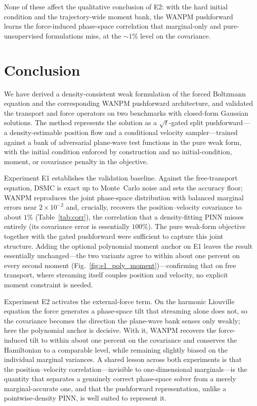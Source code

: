 \documentclass[11pt]{article}
\theoremstyle{plain}
\begin{document}
None of these affect the qualitative conclusion of E2: with the hard initial condition and the trajectory-wide moment bank, the WANPM pushforward learns the force-induced phase-space correlation that marginal-only and pure-unsupervised
formulations miss, at the $\sim\!1\%$ level on the covariance.


\section{Conclusion}
\label{sec:conclusion}

We have derived a density-consistent weak formulation of the forced Boltzmann equation and the corresponding WANPM pushforward architecture, and validated the transport and force operators on two benchmarks with closed-form Gaussian solutions. The method represents the solution as a $\sqrt t$-gated split pushforward---a density-estimable position flow and a conditional velocity sampler---trained against a bank of adversarial plane-wave test functions in the pure weak form, with the initial condition enforced by construction and no initial-condition, moment, or covariance penalty in the objective.

Experiment E1 establishes the validation baseline. Against the free-transport equation, DSMC is exact up to Monte~Carlo noise and sets the accuracy floor; WANPM reproduces the joint phase-space distribution with balanced marginal errors near $2\times10^{-2}$ and, crucially, recovers the position--velocity covariance to about $1\%$ (Table~\ref{tab:corr}), the correlation that a density-fitting PINN misses entirely (its covariance error is essentially $100\%$). The pure weak-form objective together with the gated pushforward were sufficient to capture this joint structure. Adding the optional polynomial moment anchor on E1 leaves the result essentially unchanged---the two variants agree to within about one percent on every second moment (Fig.~\ref{fig:e1_poly_moment})---confirming that on free transport, where streaming itself couples position and velocity, no explicit moment constraint is needed.

Experiment E2 activates the external-force term. On the harmonic Liouville equation the force generates a phase-space tilt that streaming alone does not, so the covariance becomes the direction the plane-wave bank senses only weakly; here the polynomial anchor is decisive. With it, WANPM recovers the force-induced tilt to within about one percent on the covariance and conserves the Hamiltonian to a comparable level, while remaining slightly biased on the individual marginal variances. A shared lesson across both experiments is that the position--velocity correlation---invisible to one-dimensional marginals---is the quantity that separates a genuinely correct phase-space solver from a merely marginal-accurate one, and that the pushforward representation, unlike a pointwise-density PINN, is well suited to represent it.
\end{document}
